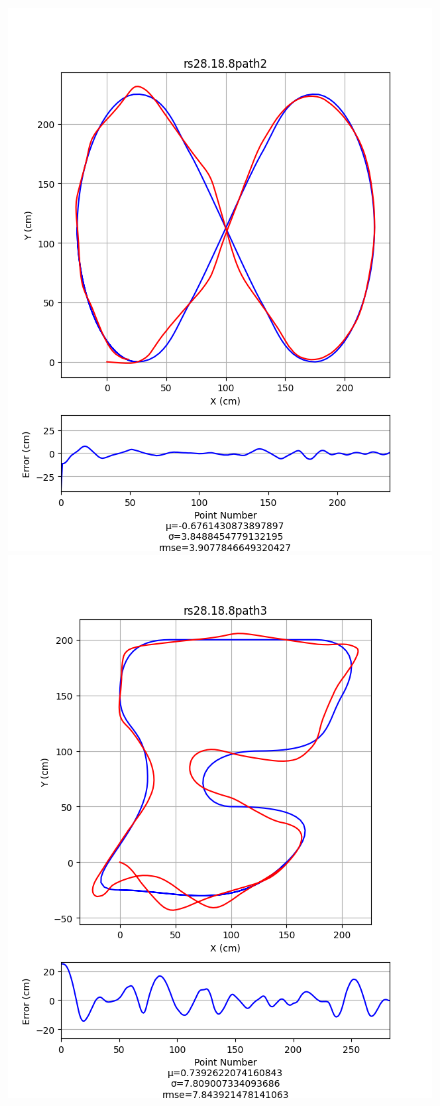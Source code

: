 \documentclass[12pt]{article}
\begin{document}
\begin{flushleft}
\begin{figure}[H]
\includegraphics[width=\linewidth]{images/pathData/rspath2}
\endminipage\\
\includegraphics[width=\linewidth]{images/pathData/rspath3}

\end{figure}
\end{flushleft}
\end{document}
